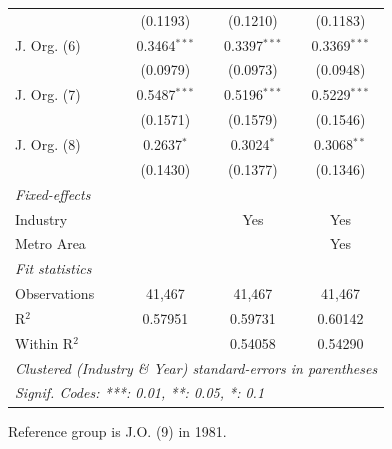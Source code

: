 \documentclass[
  12pt]{article}
\begin{document}
\begin{table}
\begin{minipage}[t]{\linewidth}
{\begin{tabular}{lccc}
                  & (0.1193)       & (0.1210)       & (0.1183)\\   
   J. Org. (6)    & 0.3464$^{***}$ & 0.3397$^{***}$ & 0.3369$^{***}$\\   
                  & (0.0979)       & (0.0973)       & (0.0948)\\   
   J. Org. (7)    & 0.5487$^{***}$ & 0.5196$^{***}$ & 0.5229$^{***}$\\   
                  & (0.1571)       & (0.1579)       & (0.1546)\\   
   J. Org. (8)    & 0.2637$^{*}$   & 0.3024$^{*}$   & 0.3068$^{**}$\\   
                  & (0.1430)       & (0.1377)       & (0.1346)\\   
   \midrule
   \emph{Fixed-effects}\\
   Industry       &                & Yes            & Yes\\  
   Metro Area     &                &                & Yes\\  
   \midrule
   \emph{Fit statistics}\\
   Observations   & 41,467         & 41,467         & 41,467\\  
   R$^2$          & 0.57951        & 0.59731        & 0.60142\\  
   Within R$^2$   &                & 0.54058        & 0.54290\\  
   \midrule \midrule
   \multicolumn{4}{l}{\emph{Clustered (Industry \& Year) standard-errors in parentheses}}\\
   \multicolumn{4}{l}{\emph{Signif. Codes: ***: 0.01, **: 0.05, *: 0.1}}\\
\end{tabular}

}

\end{minipage}%
\newline
\begin{minipage}[t]{\linewidth}
\subcaption{\label{tbl-reg-jo-tax-2}}

{\centering 

\par \raggedright

}

\end{minipage}%
\newline
\begin{minipage}[t]{\linewidth}

{\centering 

Reference group is J.O. (9) in 1981.

}
\end{minipage}
\end{table}
\end{document}
